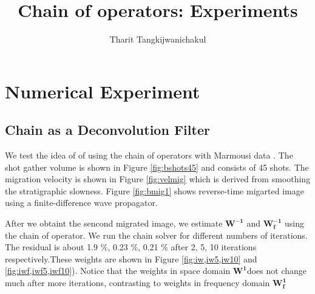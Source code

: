 \title{Chain of operators: Experiments}
\renewcommand{\thefootnote}{\fnsymbol{footnote}}
\relax{}
\author{Tharit Tangkijwanichakul}
\label{ch:chapter-lsrtm}

\maketitle

\section{Numerical Experiment}

\subsection{Chain as a Deconvolution Filter}
%

We test the idea of of using the chain of operators with Marmousi data \cite[]{versteeg1994}. The shot gather volume is shown in Figure \ref{fig:bshots45} and consists of 45 shots. The migration velocity is shown in Figure \ref{fig:velmig} which is derived from smoothing the stratigraphic slowness. Figure \ref{fig:bmig1} shows reverse-time migarted image using a finite-difference wave propagator. 


%

After we obtaint the sencond migrated image, we estimate $\mathbf{W^{-1}}$ and $\mathbf{W_f^{-1}}$ using the chain of operator. 
We run the chain solver for different numbers of iterations. The residual is about 1.9 $\%$, 0.23 $\%$, 0.21 $\%$ after 2, 5, 10 iterations respectively.These weights are shown in Figure \ref{fig:iw,iw5,iw10} and \ref{fig:iwf,iwf5,iwf10}). Notice that the weights in space domain $\mathbf{W^{1}}$does not change much after more iterations, contrasting to weights in frequency domain $\mathbf{W_f^{1}}$



%

